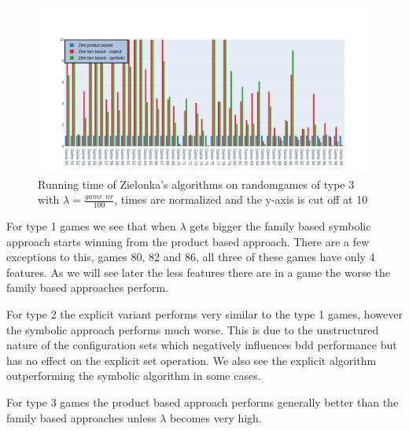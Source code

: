 \begin{figure}[H]
\includegraphics[width=1\linewidth]{"results/BC_randomgames/Zlnk product based_Zlnk fam based - explicit_Zlnk fam based - symbolic_"}
\caption{Running time of Zielonka's algorithms on randomgames of type 3 with $\lambda = \frac{\textit{game nr}}{100}$, times are normalized and the y-axis is cut off at 10}
\label{fig:elevatorzlnks}
\end{figure}%
For type 1 games we see that when $\lambda$ gets bigger the family based symbolic approach starts winning from the product based approach. There are a few exceptions to this, games 80, 82 and 86, all three of these games have only 4 features. As we will see later the less features there are in a game the worse the family based approaches perform.

For type 2 the explicit variant performs very similar to the type 1 games, however the symbolic approach performs much worse. This is due to the unstructured nature of the configuration sets which negatively influences bdd performance but has no effect on the explicit set operation. We also see the explicit algorithm outperforming the symbolic algorithm in some cases.

For type 3 games the product based approach performs generally better than the family based approaches unless $\lambda$ becomes very high.

